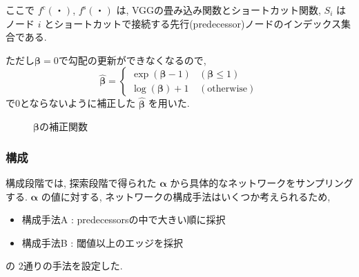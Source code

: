 ここで $f^{\mathrm{c}}(・)$, $f^{\mathrm{s}}(・)$ は, VGGの畳み込み関数とショートカット関数,
$S_i$ はノード $i$ とショートカットで接続する先行(predecessor)ノードのインデックス集合である.

ただし$\bm{\beta}=0$で勾配の更新ができなくなるので,
\begin{equation}
  \label{equ:beta}
  \hat{\bm{\beta}} = \begin{cases}
    \exp(\bm{\beta} - 1) & (\bm{\beta} \leq 1) \\
    \log(\bm{\beta}) + 1 & (\mathrm{otherwise})
  \end{cases}
\end{equation}
で0とならないように補正した $\hat{\bm{\beta}}$ を用いた.

\begin{figure}[t]
  \begin{center}
  \end{center}
  \caption{$\bm{\beta}$の補正関数}
  \label{fig:pred/beta}
\end{figure}




\subsubsection{構成}

構成段階では, 探索段階で得られた $\bm{\alpha}$ から具体的なネットワークをサンプリングする.
$\bm{\alpha}$ の値に対する, ネットワークの構成手法はいくつか考えられるため,
\begin{itemize}
  \item 構成手法A : predecessorsの中で大きい順に採択
  \item 構成手法B : 閾値以上のエッジを採択
\end{itemize}
の 2通りの手法を設定した.

